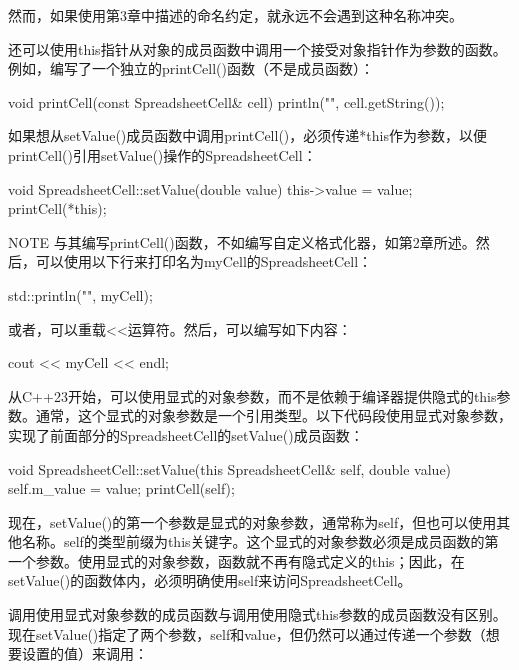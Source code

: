 然而，如果使用第3章中描述的命名约定，就永远不会遇到这种名称冲突。

还可以使用this指针从对象的成员函数中调用一个接受对象指针作为参数的函数。例如，编写了一个独立的printCell()函数（不是成员函数）：

\begin{cpp}
void printCell(const SpreadsheetCell& cell)
{
    println("{}", cell.getString());
}
\end{cpp}

如果想从setValue()成员函数中调用printCell()，必须传递*this作为参数，以便printCell()引用setValue()操作的SpreadsheetCell：

\begin{cpp}
void SpreadsheetCell::setValue(double value)
{
    this->value = value;
    printCell(*this);
}
\end{cpp}

\begin{myNotic}{NOTE}
与其编写printCell()函数，不如编写自定义格式化器，如第2章所述。然后，可以使用以下行来打印名为myCell的SpreadsheetCell：

\begin{cpp}
std::println("{}", myCell);
\end{cpp}

或者，可以重载<{}<运算符。然后，可以编写如下内容：

\begin{cpp}
cout << myCell << endl;
\end{cpp}
\end{myNotic}



从C++23开始，可以使用显式的对象参数，而不是依赖于编译器提供隐式的this参数。通常，这个显式的对象参数是一个引用类型。以下代码段使用显式对象参数，实现了前面部分的SpreadsheetCell的setValue()成员函数：

\begin{cpp}
void SpreadsheetCell::setValue(this SpreadsheetCell& self, double value)
{
    self.m_value = value;
    printCell(self);
}
\end{cpp}

现在，setValue()的第一个参数是显式的对象参数，通常称为self，但也可以使用其他名称。self的类型前缀为this关键字。这个显式的对象参数必须是成员函数的第一个参数。使用显式的对象参数，函数就不再有隐式定义的this；因此，在setValue()的函数体内，必须明确使用self来访问SpreadsheetCell。

调用使用显式对象参数的成员函数与调用使用隐式this参数的成员函数没有区别。现在setValue()指定了两个参数，self和value，但仍然可以通过传递一个参数（想要设置的值）来调用：

